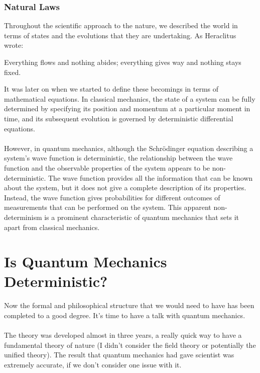 \documentclass[10pt,a4paper]{article}
\newcounter{theo}
\begin{document}
            \subsubsection{Natural Laws}
                Throughout the scientific approach to the nature, we described the world in terms of states and the evolutions that they are undertaking. As Heraclitus wrote:
                \begin{qt}
                    Everything flows and nothing abides; everything gives way and nothing stays fixed.
                \end{qt}
                It was later on when we started to define these becomings in terms of mathematical equations. In classical mechanics, the state of a system can be fully determined by specifying its position and momentum at a particular moment in time, and its subsequent evolution is governed by deterministic differential equations. 
                \\
                \\
                However, in quantum mechanics, although the Schrödinger equation describing a system's wave function is deterministic, the relationship between the wave function and the observable properties of the system appears to be non-deterministic. The wave function provides all the information that can be known about the system, but it does not give a complete description of its properties. Instead, the wave function gives probabilities for different outcomes of measurements that can be performed on the system. This apparent non-determinism is a prominent characteristic of quantum mechanics that sets it apart from classical mechanics.\cite{enwiki:1092966327}
    \section{Is Quantum Mechanics Deterministic?}
        Now the formal and philosophical structure that we would need to have has been completed to a good degree. It's time to have a talk with quantum mechanics.
        \\
        \\
        The theory was developed almost in three years, a really quick way to have a fundamental theory of nature (I didn't consider the field theory or potentially the unified theory). The result that quantum mechanics had gave scientist was extremely accurate, if we don't consider one issue with it.\cite{enwiki:1142268588}
\end{document}
